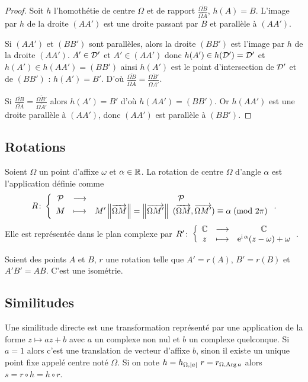 \begin{proof}
  Soit \(h\) l'homothétie de centre \(\Omega\) et de rapport
  \(\frac{\overline{\Omega B}}{\overline{\Omega A}}\), \(h(A) = B\).
  L'image par \(h\) de la droite \((AA')\) est une droite passant par
  \(B\) et parallèle à \((AA')\).

  Si \((AA')\) et \((BB')\) sont parallèles, alors la droite \((BB')\)
  est l'image par \(h\) de la droite \((AA')\). \(A' \in \mathcal{D}'\) et \(A'
  \in (AA')\) donc \(h(A') \in h(\mathcal{D}') = \mathcal{D}'\) et \(h(A') \in h(AA') =
  (BB')\) ainsi \(h(A')\) est le point d'intersection de \(\mathcal{D}'\) et de
  \((BB')\) : \(h(A') = B'\). D'où \(\frac{\overline{\Omega
  B}}{\overline{\Omega A}} = \frac{\overline{\Omega
  B'}}{\overline{\Omega A'}}\).

  Si \(\frac{\overline{\Omega B}}{\overline{\Omega A}} =
  \frac{\overline{\Omega B'}}{\overline{\Omega A'}}\) alors \(h(A') =
  B'\) d'où \(h(AA') = (BB')\). Or \(h(AA')\) est une droite parallèle à
  \((AA')\), donc \((AA')\) est parallèle à \((BB')\).
\end{proof}

\subsection{Rotations}

\begin{defdef}
  Soient \(\Omega\) un point d'affixe \(\omega\) et \(\alpha \in \mathbb{R}\).
  La rotation de centre \(\Omega\) d'angle \(\alpha\) est l'application
  définie comme \begin{equation}
    R\colon\left\{\begin{array}{ccc}\mathcal{P} & \longrightarrow &\mathcal{P}\\M & \longmapsto & M' \left\lVert\overrightarrow{\Omega M}\right\rVert=
      \left\lVert\overrightarrow{\Omega M'}\right\rVert \ (\overrightarrow{\Omega M},\overrightarrow{\Omega
    M'}) \equiv \alpha\!\pmod {2\pi}\end{array}\right..
  \end{equation}
  Elle est représentée dans le plan complexe par
  \(R'\colon\left\{\begin{array}{ccc}\mathbb{C} & \longrightarrow &\mathbb{C}\\z & \longmapsto & \operatorname{e}^{\operatorname{i} \alpha}(z - \omega) + \omega\end{array}\right.\).
\end{defdef}

\begin{prop}
  Soient des points \(A\) et \(B\), \(r\) une rotation telle que \(A' =
  r(A)\), \(B' = r(B)\) et \(A'B' = AB\). C'est une isométrie.
\end{prop}

\subsection{Similitudes}

Une similitude directe est une transformation représenté par une
application de la forme \(z \longmapsto az + b\) avec \(a\) un complexe
non nul et \(b\) un complexe quelconque. Si \(a = 1\) alors c'est une
translation de vecteur d'affixe \(b\), sinon il existe un unique point
fixe appelé centre noté \(\Omega\). Si on note \(h = h_{\Omega, \left\lvert a\right\rvert} \
r = r_{\Omega, \operatorname{Arg}{a}}\) alors \(s = r \circ h = h \circ r\).

